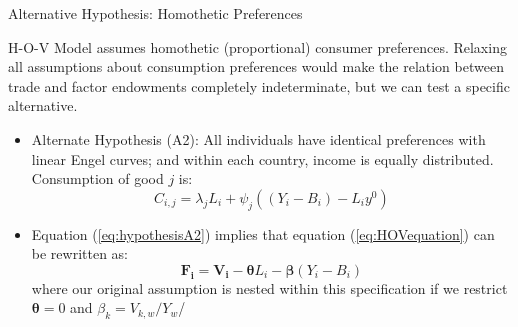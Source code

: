 \documentclass[aspectratio=169]{beamer}
\begin{document}
\begin{frame}{Alternative Hypothesis:  Homothetic Preferences}

H-O-V Model assumes homothetic (proportional) consumer preferences.  Relaxing all assumptions about consumption preferences would make the relation between trade and factor endowments completely indeterminate, but we can test a specific alternative.

\begin{itemize}
    \item<1-> Alternate Hypothesis (A2):  All individuals have identical preferences with linear Engel curves; and within each country, income is equally distributed.  Consumption of good $ j $ is:
    \begin{equation}
        C_{i,j} = \lambda_{j}L_{i} + \psi_{j}\left( \left( Y_{i} - B_{i} \right) - L_{i}y^{0} \right)
        \label{eq:hypothesisA2}
    \end{equation}
    \item<2-> Equation (\ref{eq:hypothesisA2}) implies that equation (\ref{eq:HOVequation}) can be rewritten as:
    \begin{equation*}
        \mathbf{F_{i}} = \mathbf{V_{i}} - \mathbf{\theta}L_{i} - \mathbf{\beta}\left( Y_{i} - B_{i} \right)
    \end{equation*}
    where our original assumption is nested within this specification if we restrict $ \mathbf{\theta} = 0 $ and $ \beta_k = V_{k,w} / Y_{w} $/
\end{itemize}
    
\end{frame}

\end{document}
